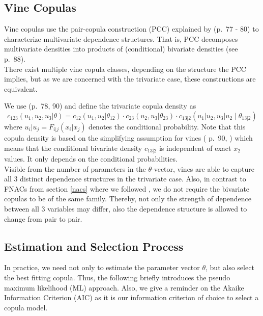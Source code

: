 \documentclass[
]{krantz}
\begin{document}
\subsection{Vine Copulas}\label{vines}

Vine copulas use the pair-copula construction (PCC) explained by \citet{czado2019} (p.~77 - 80) to characterize
multivariate dependence structures.
That is, PCC decomposes multivariate densities into products of (conditional) bivariate densities (see \citet{czado2019} p.~88).\\
There exist multiple vine copula classes, depending on the structure the PCC implies, but as we are concerned with the trivariate case,
these constructions are equivalent.

We use \citet{czado2019} (p.~78, 90) and define the trivariate copula density as\\
\[
c_{123}(u_1, u_2, u_3|\theta) = c_{12}(u_1, u_2|\theta_{12}) \cdot  c_{23}(u_2, u_3|\theta_{23})  \cdot c_{13|2}(u_1|u_2, u_3|u_2\mid \theta_{13|2})
\label{eq:simpvinecopdf}
\]
where \(u_i|u_j = F_{i|j}(x_i|x_j)\) denotes the conditional probability.
Note that this copula density is based on the simplifying assumption for vines (\citet{czado2019} p.~90, \citet{nagler2018}) which means
that the conditional bivariate density \(c_{13|2}\) is independent of exact \(x_2\) values.
It only depends on the conditional probabilities.\\
Visible from the number of parameters in the \(\theta\)-vector, vines are able to capture all \(3\) distinct
dependence structures in the trivariate case.
Also, in contrast to FNACs from section \ref{nacs} where we followed \citet{grimaldi2006}, we do not require the bivariate copulas to be of the same family. Thereby,
not only the strength of dependence between all \(3\) variables may differ, also
the dependence structure is allowed to change from pair to pair.

\subsection{Estimation and Selection Process}\label{est}

In practice, we need not only to estimate the parameter vector \(\theta\), but also select the best fitting copula.
Thus, the following briefly introduces the pseudo maximum likelihood (ML) approach.
Also, we give a reminder on the Akaike Information Criterion (AIC) as it is our information criterion of choice to select a copula model.
\end{document}

